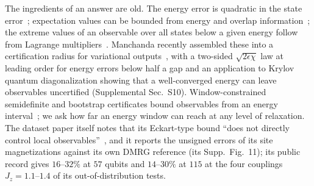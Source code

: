 \documentclass[aps,prx,twocolumn,10pt,superscriptaddress,nofootinbib,longbibliography,floatfix]{revtex4-2}
\theoremstyle{remark}
\newcommand{\Jz}{J_z}
\begin{document}
The ingredients of an answer are old. The energy error is quadratic in the state error~\cite{eckart1930}; expectation
values can be bounded from energy and overlap information~\cite{weinhold1968}; the extreme values of an observable over
all states below a given energy follow from Lagrange multipliers~\cite{cohen1971}. Manchanda recently assembled these
into a certification radius for variational outputs~\cite{manchanda2026}, with a two-sided $\sqrt{2\epsilon\chi}$ law
at leading order for energy errors below half a gap and an application to Krylov quantum diagonalization showing
that a well-converged energy can leave observables uncertified (Supplemental Sec.~S10). Window-constrained semidefinite and bootstrap certificates bound observables from
an energy interval~\cite{wang2024prx,wang2026scipost,vallee2026,banerjee2026}; we ask how far an energy window can
reach at any level of relaxation. The dataset paper itself notes that its
Eckart-type bound ``does not directly control local observables''~\cite{jaderberg2026}, and it reports the
unsigned errors of its site magnetizations against its own DMRG reference (its Supp.\ Fig.~11); its public record
gives $16$--$32\%$ at $57$ qubits and $14$--$30\%$ at $115$ at the four couplings %
$\Jz=1.1$--$1.4$ of its out-of-distribution tests. %
\end{document}
